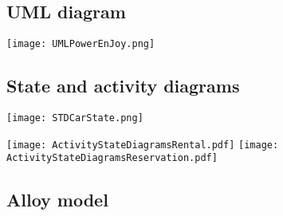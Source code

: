 \documentclass{scrreprt}
\begin{document}
\subsection{UML diagram}
\begin{center}
\texttt{[image: UMLPowerEnJoy.png]}
\end{center}

\subsection{State and activity diagrams}
\begin{center}
\texttt{[image: STDCarState.png]}

\begin{comment}
\begin{figure}
\caption{}
\texttt{[image: ]}
\end{figure}
\end{comment}
\texttt{[image: ActivityStateDiagramsRental.pdf]}
\texttt{[image: ActivityStateDiagramsReservation.pdf]}
\end{center}

\begin{comment}$<$Optionally, include any pertinent analysis models, such as data flow 
diagrams, class diagrams, state-transition diagrams, or entity-relationship 
diagrams.$>$
\end{comment}

\subsection{Alloy model}
\end{document}
